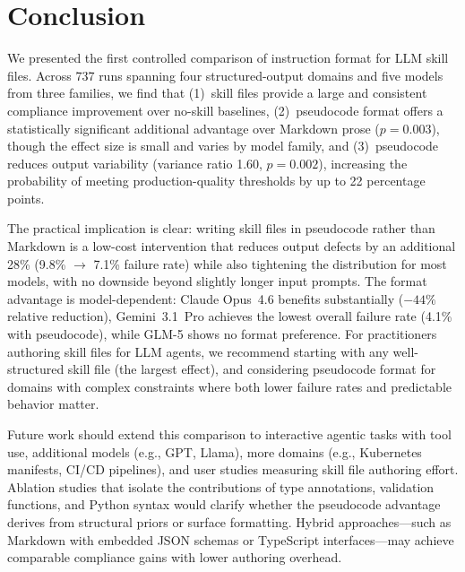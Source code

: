 \documentclass[sigconf,nonacm]{acmart}
\begin{document}

\section{Conclusion}\label{sec:conclusion}

We presented the first controlled comparison of instruction format for LLM
skill files. Across 737 runs spanning four structured-output domains and five
models from three families, we find that (1)~skill files provide a large and
consistent compliance improvement over no-skill baselines,
(2)~pseudocode format offers a statistically significant additional advantage
over Markdown prose ($p = 0.003$), though the effect size is small and
varies by model family,
and (3)~pseudocode reduces output variability (variance ratio 1.60,
$p = 0.002$), increasing the probability of meeting production-quality
thresholds by up to 22 percentage points.

The practical implication is clear: writing skill files in pseudocode rather
than Markdown is a low-cost intervention that reduces output defects by an
additional 28\% (9.8\% $\to$ 7.1\% failure rate) while also tightening the
distribution for most models, with no downside beyond slightly longer input
prompts. The format advantage is model-dependent: Claude Opus~4.6
benefits substantially ($-44\%$ relative reduction), Gemini~3.1~Pro
achieves the lowest overall failure rate (4.1\% with pseudocode), while
GLM-5 shows no format preference. For
practitioners authoring skill files for LLM agents, we recommend starting
with any well-structured skill file (the largest effect), and considering
pseudocode format for domains with complex constraints where both lower
failure rates and predictable behavior matter.

Future work should extend this comparison to interactive agentic tasks with
tool use, additional models (e.g., GPT, Llama), more domains
(e.g., Kubernetes manifests, CI/CD pipelines), and user studies measuring
skill file authoring effort. Ablation studies that isolate the contributions
of type annotations, validation functions, and Python syntax would clarify
whether the pseudocode advantage derives from structural priors or surface
formatting. Hybrid approaches---such as Markdown with embedded JSON schemas
or TypeScript interfaces---may achieve comparable compliance gains with lower
authoring overhead.
\end{document}
